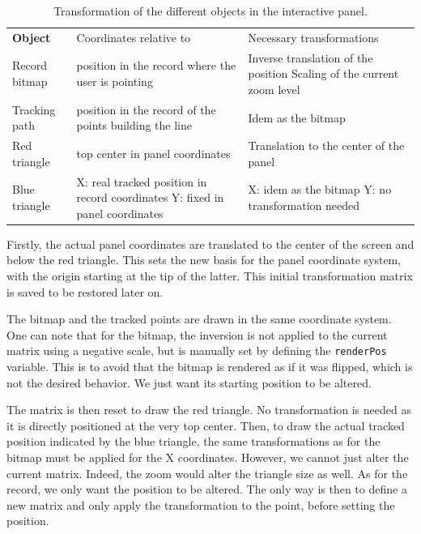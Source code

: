 \begin{table}[h!]
\begin{center}
\tabulinesep=3pt
\begin{tabu} to 0.9\textwidth {| X[-1m] | X[m] | X[m] |} %
    \everyrow{\hline}
    \hline
    \rowfont[c] \bfseries
    Object & Coordinates relative to & Necessary transformations \\
    Record bitmap & position in the record where the user is pointing  & Inverse translation of the position \newline Scaling of the current zoom level \\
    Tracking path & position in the record of the points building the line & Idem as the bitmap \\
    Red triangle & top center in panel coordinates & Translation to the center of the panel \\
    Blue triangle & X: real tracked position in record coordinates \newline Y: fixed in panel coordinates & X: idem as the bitmap \newline Y: no transformation needed \\
\end{tabu}
\end{center}
\caption{Transformation of the different objects in the interactive panel.}
\label{tab:transforms}
\end{table}

Firstly, the actual panel coordinates are translated to the center of the screen and below the red triangle. This sets the new basis for the panel coordinate system, with the origin starting at the tip of the latter. This initial transformation matrix is saved to be restored later on.

The bitmap and the tracked points are drawn in the same coordinate system. One can note that for the bitmap, the inversion is not applied to the current matrix using a negative scale, but is manually set by defining the \texttt{renderPos} variable. This is to avoid that the bitmap is rendered as if it was flipped, which is not the desired behavior. We just want its starting position to be altered.

The matrix is then reset to draw the red triangle. No transformation is needed as it is directly positioned at the very top center. Then, to draw the actual tracked position indicated by the blue triangle, the same transformations as for the bitmap must be applied for the X coordinates. However, we cannot just alter the current matrix. Indeed, the zoom would alter the triangle size as well. As for the record, we only want the position to be altered. The only way is then to define a new matrix and only apply the transformation to the point, before setting the position.

